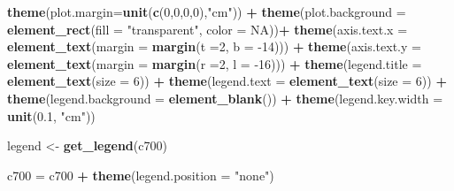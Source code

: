 \documentclass[12pt,oneside]{reedthesis}
\newenvironment{Shaded}{\begin{snugshade}}{\end{snugshade}}
\newcommand{\DataTypeTok}[1]{\textcolor[rgb]{0.13,0.29,0.53}{#1}}
\newcommand{\DecValTok}[1]{\textcolor[rgb]{0.00,0.00,0.81}{#1}}
\newcommand{\FloatTok}[1]{\textcolor[rgb]{0.00,0.00,0.81}{#1}}
\newcommand{\KeywordTok}[1]{\textcolor[rgb]{0.13,0.29,0.53}{\textbf{#1}}}
\newcommand{\NormalTok}[1]{#1}
\newcommand{\OperatorTok}[1]{\textcolor[rgb]{0.81,0.36,0.00}{\textbf{#1}}}
\newcommand{\OtherTok}[1]{\textcolor[rgb]{0.56,0.35,0.01}{#1}}
\newcommand{\StringTok}[1]{\textcolor[rgb]{0.31,0.60,0.02}{#1}}
\begin{document}
\begin{Shaded}
\begin{Highlighting}[]
\StringTok{  }\KeywordTok{theme}\NormalTok{(}\DataTypeTok{plot.margin=}\KeywordTok{unit}\NormalTok{(}\KeywordTok{c}\NormalTok{(}\DecValTok{0}\NormalTok{,}\DecValTok{0}\NormalTok{,}\DecValTok{0}\NormalTok{,}\DecValTok{0}\NormalTok{),}\StringTok{"cm"}\NormalTok{)) }\OperatorTok{+}
\StringTok{  }\KeywordTok{theme}\NormalTok{(}\DataTypeTok{plot.background =} \KeywordTok{element_rect}\NormalTok{(}\DataTypeTok{fill =} \StringTok{"transparent"}\NormalTok{, }\DataTypeTok{color =} \OtherTok{NA}\NormalTok{))}\OperatorTok{+}
\StringTok{  }\KeywordTok{theme}\NormalTok{(}\DataTypeTok{axis.text.x =} \KeywordTok{element_text}\NormalTok{(}\DataTypeTok{margin =}  \KeywordTok{margin}\NormalTok{(}\DataTypeTok{t =}\DecValTok{2}\NormalTok{, }\DataTypeTok{b =} \DecValTok{-14}\NormalTok{))) }\OperatorTok{+}\StringTok{ }
\StringTok{  }\KeywordTok{theme}\NormalTok{(}\DataTypeTok{axis.text.y =} \KeywordTok{element_text}\NormalTok{(}\DataTypeTok{margin =}  \KeywordTok{margin}\NormalTok{(}\DataTypeTok{r =}\DecValTok{2}\NormalTok{, }\DataTypeTok{l =} \DecValTok{-16}\NormalTok{))) }\OperatorTok{+}
\StringTok{  }\KeywordTok{theme}\NormalTok{(}\DataTypeTok{legend.title =} \KeywordTok{element_text}\NormalTok{(}\DataTypeTok{size =} \DecValTok{6}\NormalTok{)) }\OperatorTok{+}
\StringTok{  }\KeywordTok{theme}\NormalTok{(}\DataTypeTok{legend.text =} \KeywordTok{element_text}\NormalTok{(}\DataTypeTok{size =} \DecValTok{6}\NormalTok{)) }\OperatorTok{+}\StringTok{ }
\StringTok{  }\KeywordTok{theme}\NormalTok{(}\DataTypeTok{legend.background =} \KeywordTok{element_blank}\NormalTok{()) }\OperatorTok{+}
\StringTok{  }\KeywordTok{theme}\NormalTok{(}\DataTypeTok{legend.key.width =} \KeywordTok{unit}\NormalTok{(}\FloatTok{0.1}\NormalTok{, }\StringTok{"cm"}\NormalTok{))}

\NormalTok{legend <-}\StringTok{ }\KeywordTok{get_legend}\NormalTok{(c700)}

\NormalTok{c700 =}\StringTok{ }\NormalTok{c700 }\OperatorTok{+}\StringTok{ }\KeywordTok{theme}\NormalTok{(}\DataTypeTok{legend.position =} \StringTok{"none"}\NormalTok{)}


\end{Highlighting}
\end{Shaded}
\end{document}
